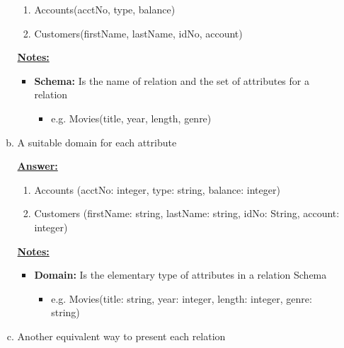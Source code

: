 \documentclass[12pt]{article}
\begin{document}
\begin{enumerate}[1.]
\begin{enumerate}[a)]
\begin{mdframed}
            \begin{enumerate}[1.]
                \item Accounts(acctNo, type, balance)
                \item Customers(firstName, lastName, idNo, account)
            \end{enumerate}
        \end{mdframed}

        \bigskip

        \underline{\textbf{Notes:}}

        \begin{itemize}
            \item \textbf{Schema:} Is the name of relation and the set of attributes
            for a relation

            \begin{itemize}
                \item e.g. Movies(title, year, length, genre)
            \end{itemize}
        \end{itemize}

        \item A suitable domain for each attribute

        \bigskip

        \begin{mdframed}
            \underline{\textbf{Answer:}}

            \begin{enumerate}[1.]
                \item Accounts (acctNo: integer, type: string, balance: integer)
                \item Customers (firstName: string, lastName: string, idNo: String, account: integer)
            \end{enumerate}
        \end{mdframed}

        \underline{\textbf{Notes:}}

        \begin{itemize}
            \item \textbf{Domain:} Is the elementary type of attributes in a
            relation Schema

            \begin{itemize}
                \item e.g. Movies(title: string, year: integer, length: integer, genre: string)
            \end{itemize}
        \end{itemize}
        \item Another equivalent way to present each relation


\end{enumerate}
\end{enumerate}
\end{document}
